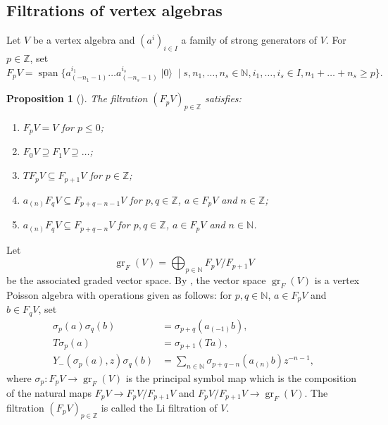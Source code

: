 \documentclass[a4paper, 12pt, reqno]{amsart}
\newtheorem{proposition}[theorem]{Proposition}
\theoremstyle{remark}
\numberwithin{equation}{subsection}
\DeclareMathOperator{\gr}{gr}
\DeclareMathOperator{\vspan}{span}
\DeclareMathOperator{\vac}{|0\rangle}
\begin{document}
\subsection{Filtrations of vertex algebras}
\label{sec:filtr-vert-algebr}

Let $V$ be a vertex algebra and $(a^i)_{i \in I}$ a family of strong generators of $V$.
For $p \in \mathbb{Z}$, set
\begin{equation*}
  F_pV = \vspan\{a^{i_1}_{(-n_1 - 1)}\dots a^{i_s}_{(-n_s - 1)}\vac \mid s, n_1, \dots, n_s \in \mathbb{N}, i_1, \dots, i_s \in I, n_1 + \dots + n_s \ge p\}.
\end{equation*}

\begin{proposition}[{\cite{li_abelianizing_2005}}]
  \label{prp:7}
  The filtration $(F_pV)_{p \in \mathbb{Z}}$ satisfies:
  \begin{enumerate}
  \item $F_pV = V$ for $p \le 0$;
  \item $F_0V \supseteq F_1V \supseteq \dots$;
  \item $TF_pV \subseteq F_{p + 1}V$ for $p \in \mathbb{Z}$;
  \item $a_{(n)}F_qV \subseteq F_{p + q - n - 1}V$ for $p, q \in \mathbb{Z}$, $a \in F_pV$ and $n \in \mathbb{Z}$;
  \item $a_{(n)}F_qV \subseteq F_{p + q - n}V$ for $p, q \in \mathbb{Z}$, $a \in F_pV$ and $n \in \mathbb{N}$.
  \end{enumerate}
\end{proposition}

Let
\begin{equation*}
  \gr_F(V) = \bigoplus_{p \in \mathbb{N}}F_pV/F_{p + 1}V
\end{equation*}
be the associated graded vector space.
By \cite{li_abelianizing_2005}, the vector space $\gr_F(V)$ is a vertex Poisson algebra with operations given as follows: for $p, q \in \mathbb{N}$, $a \in F_pV$ and $b \in F_qV$, set
\begin{align*}
  \sigma_p(a)\sigma_q(b) &= \sigma_{p + q}(a_{(-1)}b), \\
  T\sigma_p(a) &= \sigma_{p + 1}(Ta), \\
  Y_-(\sigma_p(a),z)\sigma_q(b) &= \sum_{n \in \mathbb{N}}\sigma_{p + q - n}(a_{(n)}b)z^{-n - 1},
\end{align*}
where $\sigma_p: F_pV \to \gr_F(V)$ is the principal symbol map which is the composition of the natural maps $F_pV \to F_pV/F_{p + 1}V$ and $F_pV/F_{p+1}V \to \gr_F(V)$.
The filtration $(F_pV)_{p \in \mathbb{Z}}$ is called the Li filtration of $V$.
\end{document}
